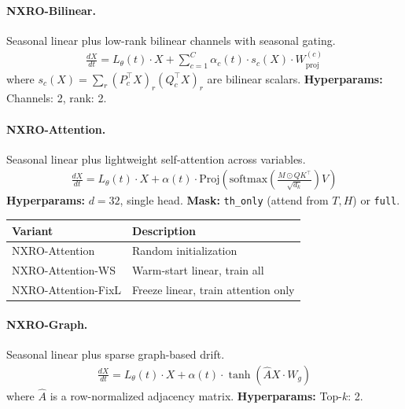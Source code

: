 \paragraph{NXRO-Bilinear.}
Seasonal linear plus low-rank bilinear channels with seasonal gating.
\begin{align*}
    \frac{dX}{dt} = L_\theta(t) \cdot X + \sum_{c=1}^{C} \alpha_c(t) \cdot s_c(X) \cdot W^{(c)}_{\text{proj}}
\end{align*}
where $s_c(X) = \sum_r (P_c^\top X)_r (Q_c^\top X)_r$ are bilinear scalars. \textbf{Hyperparams:} Channels: 2, rank: 2.

\paragraph{NXRO-Attention.}
Seasonal linear plus lightweight self-attention across variables.
\begin{align*}
    \frac{dX}{dt} = L_\theta(t) \cdot X + \alpha(t) \cdot \text{Proj}\left(\text{softmax}\left(\frac{M \odot QK^\top}{\sqrt{d_k}}\right) V\right)
\end{align*}
\textbf{Hyperparams:} $d=32$, single head. \textbf{Mask:} \texttt{th\_only} (attend from $T,H$) or \texttt{full}.

\begin{tabular}{@{}ll@{}}
\textbf{Variant} & \textbf{Description} \\
\hline
NXRO-Attention & Random initialization \\
NXRO-Attention-WS & Warm-start linear, train all \\
NXRO-Attention-FixL & Freeze linear, train attention only \\
\end{tabular}

\paragraph{NXRO-Graph.}
Seasonal linear plus sparse graph-based drift.
\begin{align*}
    \frac{dX}{dt} = L_\theta(t) \cdot X + \alpha(t) \cdot \tanh\left(\hat{A} X \cdot W_g\right)
\end{align*}
where $\hat{A}$ is a row-normalized adjacency matrix. \textbf{Hyperparams:} Top-$k$: 2.

